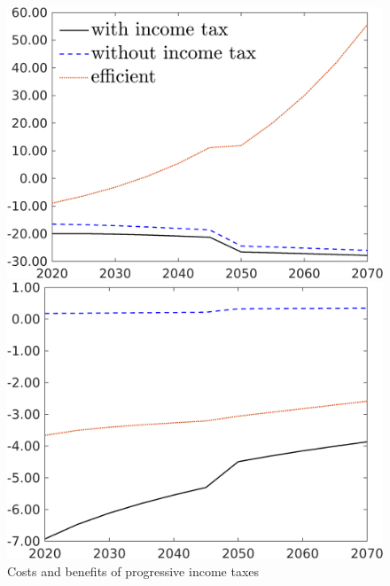 \begin{figure}[h!!]
	\centering
	\caption{Costs and benefits of progressive income taxes }\label{fig:optAll_percLf_dyn}
	\begin{minipage}[]{0.32\textwidth}
		\includegraphics[width=1\textwidth]{../../codding_model/own_basedOnFried/optimalPol_190722_tidiedUp/figures/all_10Aout22/C_PercentageLFDynNT_Target_regime3_spillover0_noskill0_sep1_xgrowth0_etaa0.79_lgd1.png}
	\end{minipage}
	\begin{minipage}[]{0.32\textwidth}
		\includegraphics[width=1\textwidth]{../../codding_model/own_basedOnFried/optimalPol_190722_tidiedUp/figures/all_10Aout22/hh_PercentageLfDynNT_Target_regime3_spillover0_noskill0_sep1_xgrowth0_etaa0.79_lgd0.png}

\end{minipage}
\end{figure}
